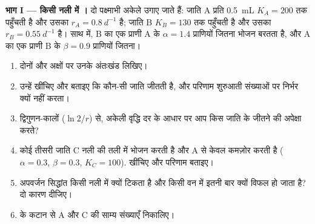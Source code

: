 \begin{problem}
\label{pb:b1:species-interactions:1}

\medskip
\noindent\textbf{भाग I --- किसी नली में ।}
दो पक्ष्माभी अकेले उगाए जाते हैं: जाति A प्रति \qty{0.5}{mL}
$K_A = 200$ तक पहुँचती है और उसका $r_A = \qty{0.8}{d^{-1}}$ है; जाति B
$K_B = 130$ तक पहुँचती है और उसका $r_B = \qty{0.55}{d^{-1}}$ है। साथ में,
B का एक प्राणी A के $\alpha = 1.4$ प्राणियों जितना भोजन बरतता है, और A का
एक प्राणी B के $\beta = 0.9$ प्राणियों जितना।
\begin{enumerate}
  \item दोनों  और अक्षों पर उनके अंतःखंड लिखिए।
  \item उन्हें खींचिए और बताइए कि कौन-सी जाति जीतती है, और परिणाम
        शुरुआती संख्याओं पर निर्भर क्यों नहीं करता।
  \item द्विगुणन-कालों ($\ln 2/r$) से, अकेली वृद्धि दर के आधार पर आप
        किस जाति के जीतने की अपेक्षा करते?
  \item कोई तीसरी जाति C नली की तली में भोजन करती है और A से केवल
        कमज़ोर  करती है ($\alpha = 0.3$, $\beta = 0.3$, $K_C = 100$).
         खींचिए और परिणाम बताइए।
  \item अपवर्जन सिद्धांत किसी नली में क्यों टिकता है और किसी वन में
        इतनी बार क्यों विफल हो जाता है? दो कारण दीजिए।
  \item {} के कटान से A और C की साम्य संख्याएँ निकालिए।
\end{enumerate}


\end{problem}
